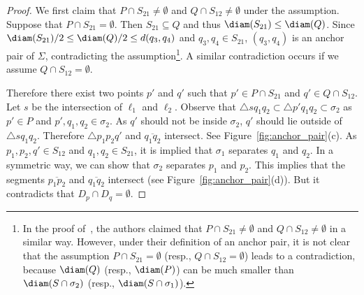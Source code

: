 \begin{proof}

    We first claim that $P \cap S_{21} \neq \emptyset$ and $Q \cap S_{12} \neq \emptyset$ under the assumption.
    Suppose that $P \cap S_{21} = \emptyset$. Then $S_{21} \subseteq Q$ and thus $\diam(S_{21}) \le \diam(Q)$.  
    Since $\diam(S_{21})/2 \le \diam(Q)/2 \le d(q_3, q_4)$ and $q_3, q_4 \in S_{21}$, $(q_3, q_4)$ is an anchor pair of $\Sigma$, contradicting the assumption\footnote{
    In the proof of~\cite{agarwalTwo}, the authors claimed that  $P \cap S_{21} \neq \emptyset$ and $Q \cap S_{12} \neq \emptyset$ in a similar way. 
    However, under their definition of an anchor pair, it is not clear that the assumption $P \cap S_{21} = \emptyset$ (resp., $Q \cap S_{12} = \emptyset$) leads to a contradiction,
    because $\diam(Q)$ (resp., $\diam(P)$) can be much smaller than $\diam(S \cap \sigma_2)$ (resp., $\diam(S \cap \sigma_1)$).}.
    A similar contradiction occurs if we assume $Q \cap S_{12} = \emptyset$.

    Therefore there exist two points $p'$ and $q'$ such that $p' \in P \cap S_{21}$ and $q' \in Q \cap S_{12}$.
    Let $s$ be the intersection of $\ell_1$ and $\ell_2$. 
    Observe that $\triangle sq_1 q_2 \subset \triangle p'q_1 q_2 \subset \sigma_2$ as $p' \in P$ and $p', q_1, q_2 \in \sigma_2$. 
    As $q'$ should not be inside $\sigma_2$, $q'$ should lie outside of $\triangle s q_1 q_2$. 
    Therefore $\triangle p_1 p_2 q'$ and $\overline{q_1 q_2}$ intersect. See Figure~\ref{fig:anchor_pair}(c).
    As $p_1, p_2, q' \in S_{12}$ and $q_1, q_2 \in S_{21}$, it is implied that  $\sigma_1$ separates $q_1$ and $q_2$.
    In a symmetric way, we can show that $\sigma_2$ separates $p_1$ and $p_2$. 
    This implies that the segments $\overline{p_1 p_2}$ and $\overline{q_1 q_2}$ intersect (see Figure~\ref{fig:anchor_pair}(d)). But it contradicts that $D_p \cap D_q = \emptyset$. 
\end{proof}


